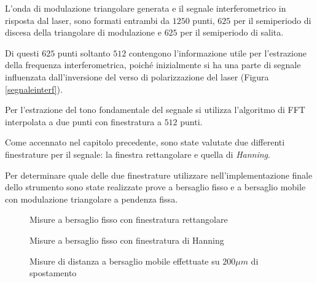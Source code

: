 L'onda di modulazione triangolare generata e il segnale interferometrico in risposta dal laser, sono formati entrambi da $1250$ punti, $625$ per il semiperiodo di discesa della triangolare di modulazione e $625$ per il semiperiodo di salita. 

Di questi $625$ punti soltanto $512$ contengono l'informazione utile per l'estrazione della frequenza interferometrica, poiché inizialmente si ha una parte di segnale influenzata dall'inversione del verso di polarizzazione del laser (Figura \ref{segnaleinterf}). 

Per l'estrazione del tono fondamentale del segnale si utilizza l'algoritmo di FFT interpolata a due punti con finestratura a $512$ punti.

Come accennato nel capitolo precedente, sono state valutate due differenti finestrature per il segnale: la finestra rettangolare e quella di \textit{Hanning}.

Per determinare quale delle due finestrature utilizzare nell'implementazione finale dello strumento sono state realizzate prove a bersaglio fisso e a bersaglio mobile con modulazione triangolare a pendenza fissa.
\begin{figure}[H]
\centering
{}
\end{figure}
\begin{figure}[H]
\centering
{}
\caption{Misure a bersaglio fisso con finestratura rettangolare}\label{misfisso1}
\end{figure}
\begin{figure}[H]
\centering
{}
\end{figure}
\begin{figure}[H]
\centering
{}
\caption{Misure a bersaglio fisso con finestratura di Hanning}\label{misfisso2}
\end{figure}

\begin{figure}[H]
\centering
{}
\end{figure}
\begin{figure}[H]
\centering
{}
\caption{Misure di distanza a bersaglio mobile effettuate su $200 \mu m$ di spostamento}\label{mismobile12}
\end{figure}

